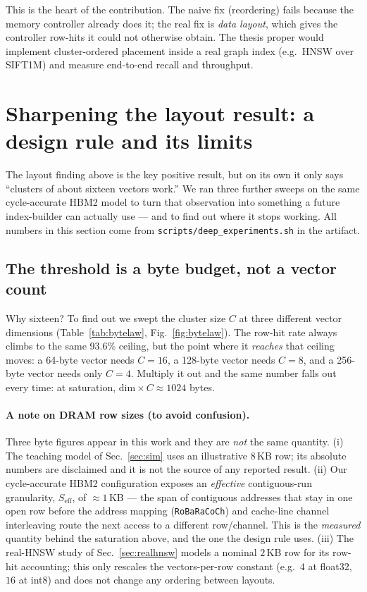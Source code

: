\documentclass[11pt,a4paper]{article}
\begin{document}
\begin{keybox}
This is the heart of the contribution. The naive fix (reordering) fails because the memory controller
already does it; the real fix is \emph{data layout}, which gives the controller row-hits it could not
otherwise obtain. The thesis proper would implement cluster-ordered placement inside a real graph
index (e.g.\ HNSW over SIFT1M) and measure end-to-end recall and throughput.
\end{keybox}

\section{Sharpening the layout result: a design rule and its limits}
\label{sec:deep}

The layout finding above is the key positive result, but on its own it only says
``clusters of about sixteen vectors work.'' We ran three further sweeps on the
same cycle-accurate HBM2 model to turn that observation into something a future
index-builder can actually use --- and to find out where it stops working. All
numbers in this section come from \texttt{scripts/deep\_experiments.sh} in the
artifact.

\subsection{The threshold is a byte budget, not a vector count}

Why sixteen? To find out we swept the cluster size $C$ at three different vector
dimensions (Table~\ref{tab:bytelaw}, Fig.~\ref{fig:bytelaw}). The row-hit rate
always climbs to the same 93.6\% ceiling, but the point where it \emph{reaches}
that ceiling moves: a 64-byte vector needs $C{=}16$, a 128-byte vector needs
$C{=}8$, and a 256-byte vector needs only $C{=}4$. Multiply it out and the same
number falls out every time: at saturation, $\mathrm{dim}\times C \approx 1024$
bytes.

\paragraph{A note on DRAM row sizes (to avoid confusion).} Three byte figures
appear in this work and they are \emph{not} the same quantity. (i) The teaching
model of Sec.~\ref{sec:sim} uses an illustrative $8$\,KB row; its absolute
numbers are disclaimed and it is not the source of any reported result.
(ii) Our cycle-accurate HBM2 configuration exposes an \emph{effective}
contiguous-run granularity, $S_\text{eff}$, of $\approx\!1$\,KB --- the span of
contiguous addresses that stay in one open row before the address mapping
(\texttt{RoBaRaCoCh}) and cache-line channel interleaving route the next access
to a different row/channel. This is the \emph{measured} quantity behind the
saturation above, and the one the design rule uses. (iii) The real-HNSW study of
Sec.~\ref{sec:realhnsw} models a nominal $2$\,KB row for its row-hit accounting;
this only rescales the vectors-per-row constant (e.g.\ $4$ at float32, $16$ at
int8) and does not change any ordering between layouts.
\end{document}
